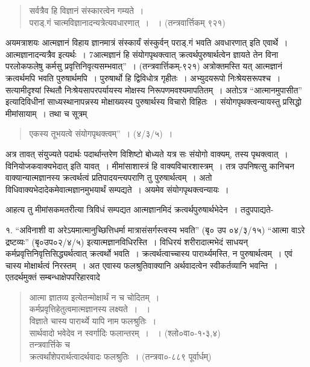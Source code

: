 {\begin{verse}
सर्वत्रैव हि विज्ञानं संस्कारत्वेन गम्यते~। \\
पराड्.गं चात्मविज्ञानादन्यत्रेत्यवधारणात्~। ~। (तन्त्रवार्त्तिकम् ९२१)
\end{verse}

अयमत्राशयः  आत्मज्ञानं विहाय ज्ञानमात्रं संस्कार्यं संस्कुर्वन् पराड्.गं भवति अवधारणात् इति एवार्थे~। आत्मज्ञानादन्यत्रैव इत्यर्थः~। 7आत्मज्ञानं हि संयोगपृथक्त्वात् क्रत्वर्थपुरुषार्थत्वेन ज्ञायते तेन विना परलोकफलेषु कर्मसु प्रवृत्तिनिवृत्यसम्भवात्”~। (तन्त्रवार्त्तिकम्-९२१) अत्रोक्तमस्ति यत् आत्मज्ञानं क्रत्वर्थमपि भवति पुरुषार्थमपि~। पुरुषार्थो हि द्विविधोत्र गृहीतः~। अभ्युदयरूपो निःश्रेयसरूपश्च~। सत्यामीदृश्यां स्थितौ निःश्रेयसापरपर्यायस्य मोक्षस्य निरूपणमवश्यमापतितम्~। अतोऽत्र “आत्मानमुपासीत” इत्यादिविधीनां साध्यस्थानापन्नस्य मोक्षाख्यस्य पुरुषार्थस्य विचारो विहितः~। संयोगपृथक्त्वन्यायस्तु प्रसिद्धो मीमांसायाम्~। तथा च सूत्रम्  

\begin{verse}
एकस्य तूभयत्वे संयोगपृथक्त्वम्”~। (४/३/५)~। 
\end{verse}
अत्र तावत् संयुज्यते पदार्थः पदार्थान्तरेण विशिष्टो बोध्यते यत्र सः संयोगो वाक्यम्, तस्य पृथक्त्वात्~। विनियोजकवाक्यभेदात् इति यावत्~। मीमांसाशास्त्रं हि वाक्यविचारशास्त्रम्~। तत्र उपनिषत्सु कानिचन वाक्यान्यात्मज्ञानस्य क्रत्वर्थत्वं प्रतिपादयन्त्यपराणि तु पुरुषार्थत्वम्~। अतो विधिवाक्यभेदादेकमेवात्मज्ञानमुभयार्थं सम्पद्यते~। अयमेव संयोगपृथक्त्वन्यायः~। 

आहत्य तु मीमांसकमतरीत्या त्रिविधं सम्पद्यत आत्मज्ञानमिदं क्रत्वर्थपुरुषार्थभेदेन~। तदुपपाद्यते-

१. “अविनाशी वा अरेऽयमात्मानुच्छित्तिधर्मा मात्रासंसर्गस्त्वस्य भवति” (बृ० उप ०४/३/१५) “आत्मा वाऽरे द्रष्टव्यः” (बृ०उप०२/४/५) इत्यात्मज्ञानविधिरस्ति~। विधिरयं शरीरादात्मभेदं साधयन् कर्मप्रवृत्तिनिवृत्तिसिद्ध्यर्थत्वात् क्रत्वर्थो भवति~। क्रत्वर्थत्वाच्चास्य पारार्थ्यमस्ति, न पुरुषार्थत्वम्~। एवं चास्य मोक्षार्थत्वं निरस्तम्~। अत एवास्य फलश्रुतिवाक्यानि अर्थवादत्वेन स्वीकर्तव्यानि भवन्ति~। एतदर्थमुक्तं सम्बन्धाक्षेपपरिहारवादे

\begin{verse}
आत्मा ज्ञातव्य इत्येतन्मोक्षार्थं न च चोदितम्~। \\
कर्मप्रवृत्तिहेतुत्वमात्मज्ञानस्य लक्ष्यते~। ~। \\
विज्ञाते चास्य पारार्थ्ये यापि नाम फलश्रुतिः~। \\
सार्थवादो भवेदेव न स्वर्गादिः फलान्तरम्~। ~। (श्लो०वा०-१॰३,४)\\
तन्त्रवार्त्तिके च\\
क्रत्वर्थांशेपरार्थत्वादर्थवादः फलश्रुतिः~। (तन्त्रवा०-८८९ पूर्वार्धम्)
\end{verse}

}
